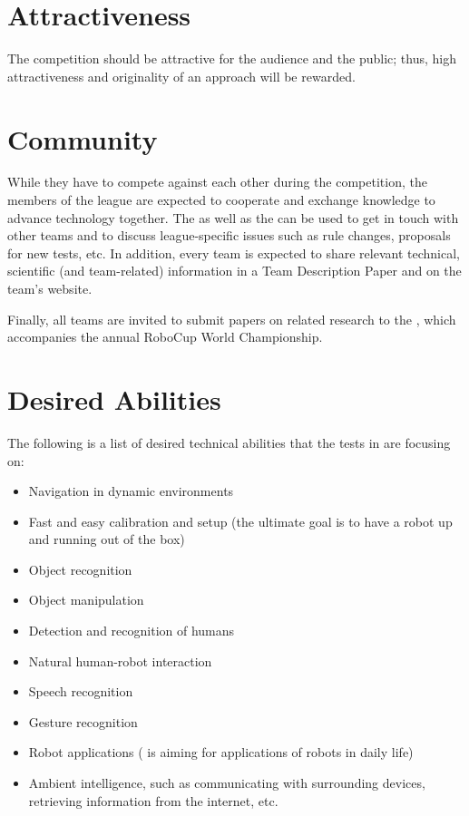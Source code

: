 \section{Attractiveness}
\label{concept:attractiveness}

The competition should be attractive for the audience and the public; thus, high attractiveness and originality of an approach will be rewarded.

\section{Community}
\label{concept:community}

While they have to compete against each other during the competition, the members of the \AtHome{} league are expected to cooperate and exchange knowledge to advance technology together.
The  as well as the \RR{} can be used to get in touch with other teams and to discuss league-specific issues such as rule changes, proposals for new tests, etc.
In addition, every team is expected to share relevant technical, scientific (and team-related) information in a Team Description Paper and on the team's website.

Finally, all teams are invited to submit papers on related research to the \Symp{}, which accompanies the annual RoboCup World Championship.

\section{Desired Abilities}
\label{concept:desired_abilities}

The following is a list of desired technical abilities that the tests in \AtHome{} are focusing on:

\begin{itemize}
    \item Navigation in dynamic environments
    \item Fast and easy calibration and setup (the ultimate goal is to have a robot up and running out of the box)
    \item Object recognition
    \item Object manipulation
    \item Detection and recognition of humans
    \item Natural human-robot interaction
    \item Speech recognition
    \item Gesture recognition
    \item Robot applications (\AtHome{} is aiming for applications of robots in daily life)
    \item Ambient intelligence, such as communicating with surrounding devices, retrieving information from the internet, etc.
\end{itemize}


